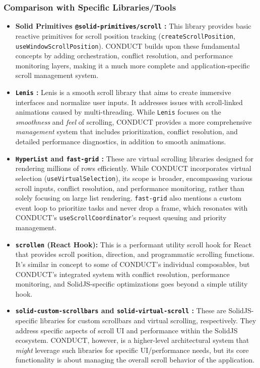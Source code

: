 \documentclass[10pt]{article}
\begin{document}
\subsubsection{Comparison with Specific Libraries/Tools}
\begin{itemize}
    \item \textbf{Solid Primitives \texttt{@solid-primitives/scroll} \cite{solidprimitives}:} This library provides basic reactive primitives for scroll position tracking (\texttt{createScrollPosition}, \texttt{useWindowScrollPosition}). CONDUCT builds upon these fundamental concepts by adding orchestration, conflict resolution, and performance monitoring layers, making it a much more complete and application-specific scroll management system.
    \item \textbf{\texttt{Lenis} \cite{lenis}:} Lenis is a smooth scroll library that aims to create immersive interfaces and normalize user inputs. It addresses issues with scroll-linked animations caused by multi-threading. While \texttt{Lenis} focuses on the \textit{smoothness} and \textit{feel} of scrolling, CONDUCT provides a more comprehensive \textit{management} system that includes prioritization, conflict resolution, and detailed performance diagnostics, in addition to smooth animations.
    \item \textbf{\texttt{HyperList} \cite{hyperlist} and \texttt{fast-grid} \cite{fastgrid}:} These are virtual scrolling libraries designed for rendering millions of rows efficiently. While CONDUCT incorporates virtual selection (\texttt{useVirtualSelection}), its scope is broader, encompassing various scroll inputs, conflict resolution, and performance monitoring, rather than solely focusing on large list rendering. \texttt{fast-grid} also mentions a custom event loop to prioritize tasks and never drop a frame, which resonates with CONDUCT's \texttt{useScrollCoordinator}'s request queuing and priority management.
    \item \textbf{\texttt{scrollen} \cite{scrollen} (React Hook):} This is a performant utility scroll hook for React that provides scroll position, direction, and programmatic scrolling functions. It's similar in concept to some of CONDUCT's individual composables, but CONDUCT's integrated system with conflict resolution, performance monitoring, and SolidJS-specific optimizations goes beyond a simple utility hook.
    \item \textbf{\texttt{solid-custom-scrollbars} \cite{solidcustomscrollbars} and \texttt{solid-virtual-scroll} \cite{solidvirtualscroll}:} These are SolidJS-specific libraries for custom scrollbars and virtual scrolling, respectively. They address specific aspects of scroll UI and performance within the SolidJS ecosystem. CONDUCT, however, is a higher-level architectural system that \textit{might} leverage such libraries for specific UI/performance needs, but its core functionality is about managing the overall scroll behavior of the application.
\end{itemize}
\end{document}
